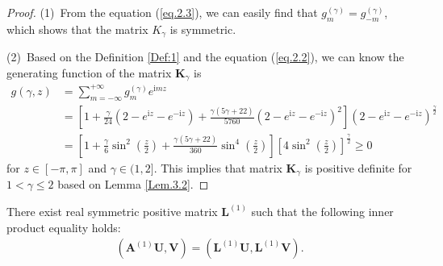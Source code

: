 \documentclass{siamart171218}
\numberwithin{theorem}{section}
\numberwithin{equation}{section}
\begin{document}
\begin{proof}
(1)~From the equation (\ref{eq.2.3}), we can easily find that $g_m^{(\gamma)}=g_{-m}^{(\gamma)}$,
which shows that the
 matrix $K_\gamma$ is symmetric.

(2)~Based on the Definition
\ref{Def:1} and the equation (\ref{eq.2.2}),
we can know the generating function of the matrix
${\mathbf{K}}_\gamma$ is
\begin{equation*}
\begin{aligned}
 g(\gamma,z)&=
\sum\limits_{m=-\infty}^{+\infty}
g_{m}^{(\gamma)}e^{\mathrm{i}mz}\\
&=
\left[1+\frac{\gamma}{24}\left(2-e^{\mathrm{i}z}
-e^{-\mathrm{i}z}\right)+\frac{\gamma\left(5\gamma+22\right)}{5760}
 \left(2-e^{\mathrm{i}z}-e^{-\mathrm{i}z}\right)^2\right]
\left(2-e^{\mathrm{i}z}-e^{-\mathrm{i}z}\right)^{\frac{\gamma}{2}}\\
&=\left[1+\frac{\gamma}{6}\sin^2\left(\frac{z}{2}\right)
+\frac{\gamma(5\gamma+22)}{360}\sin^4\left(\frac{z}{2}\right)
\right]
\left[4\sin^2\left(\frac{z}{2}\right)\right]^{\frac{\gamma}{2}}\geq0
\end{aligned}
\end{equation*}
for $z\in[-\pi,\pi]$ and $\gamma\in(1,2]$.
This implies that matrix $\mathbf{K}_\gamma$ is positive definite for $1<\gamma\leq2$
based on Lemma \ref{Lem.3.2}.
\end{proof}

\begin{lemma}\label{Lem.3.4}
There exist real symmetric positive matrix
${\mathbf{L}}^{(1)}$ such that the following inner product equality holds:
\begin{equation*}
\begin{aligned}
\left({\mathbf{A}}^{(1)}\mathbf{U},\mathbf{V}\right)=\left({\mathbf{L}}^{(1)}
\mathbf{U},{\mathbf{L}}^{(1)}\mathbf{V}\right).
\end{aligned}
\end{equation*}
\end{lemma}
\end{document}
